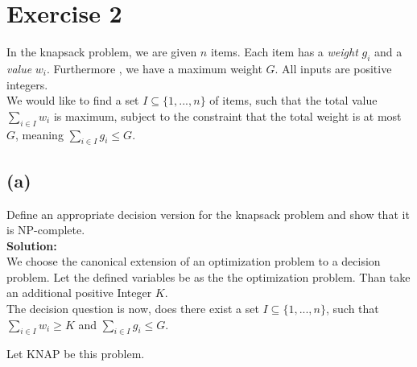 \section*{Exercise 2}

In the knapsack problem, we are given $n$ items. Each item has a \emph{weight} $g_i$ and a \emph{value} $w_i$.
Furthermore , we have a maximum weight $G$. All inputs are positive integers.\\

We would like to find a set $I \subseteq \{ 1,...,n \}$ of items, such that the total value
$\underset{i \in I}{\sum} w_i$ is maximum, subject to the constraint that the total weight is at most
$G$, meaning $\underset{i \in I}{\sum} g_i \leq G$.

\subsection*{(a)} 

Define an appropriate decision version for the knapsack problem and show that it is NP-complete.\\

\textbf{Solution:}\\
We choose the canonical extension of an optimization problem to a decision problem. Let the defined variables
be as the the optimization problem. Than take an additional positive Integer $K$.\\

The decision question is now, does there exist a set $I \subseteq \{ 1, ... , n \}$, such that
$\underset{i \in I}{\sum} w_i \geq K$ and $\underset{ i \in I}{\sum} g_i \leq G$.

Let KNAP be this problem.

